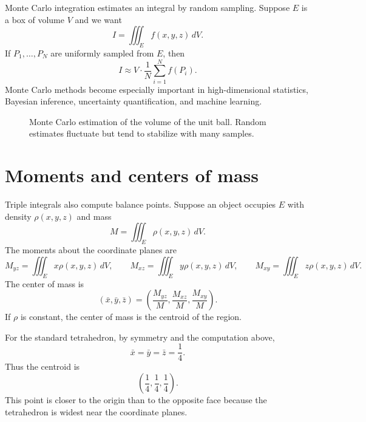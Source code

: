 \documentclass[11pt]{article}
\newcounter{examplecounter}
\newenvironment{workedexample}[1]{%
  \refstepcounter{examplecounter}%
  \begin{tcolorbox}[enhanced,breakable,colback=white,colframe=chapterblue,colbacktitle=chapterblue,
  title={Example 16.\theexamplecounter: #1},fonttitle=\bfseries,boxrule=0.8pt,arc=1.5mm]
}{\end{tcolorbox}}
\begin{document}
Monte Carlo integration estimates an integral by random sampling. Suppose $E$ is a box of volume $V$ and we want
\[
I=\iiint_E f(x,y,z)\,dV.
\]
If $P_1,\dots,P_N$ are uniformly sampled from $E$, then
\[
I\approx V\cdot \frac1N\sum_{i=1}^N f(P_i).
\]
Monte Carlo methods become especially important in high-dimensional statistics, Bayesian inference, uncertainty quantification, and machine learning.

\begin{figure}[H]
\centering
{}
\caption{Monte Carlo estimation of the volume of the unit ball. Random estimates fluctuate but tend to stabilize with many samples.}
\end{figure}

\section{Moments and centers of mass}

Triple integrals also compute balance points. Suppose an object occupies $E$ with density $\rho(x,y,z)$ and mass
\[
M=\iiint_E \rho(x,y,z)\,dV.
\]
The moments about the coordinate planes are
\[
M_{yz}=\iiint_E x\rho(x,y,z)\,dV,
\qquad
M_{xz}=\iiint_E y\rho(x,y,z)\,dV,
\qquad
M_{xy}=\iiint_E z\rho(x,y,z)\,dV.
\]
The center of mass is
\[
(\bar x,\bar y,\bar z)=\left(\frac{M_{yz}}{M},\frac{M_{xz}}{M},\frac{M_{xy}}{M}\right).
\]
If $\rho$ is constant, the center of mass is the centroid of the region.

\begin{workedexample}{Centroid of the standard tetrahedron}
For the standard tetrahedron, by symmetry and the computation above,
\[
\bar x=\bar y=\bar z=\frac14.
\]
Thus the centroid is
\[
\left(\frac14,\frac14,\frac14\right).
\]
This point is closer to the origin than to the opposite face because the tetrahedron is widest near the coordinate planes.
\end{workedexample}
\end{document}
